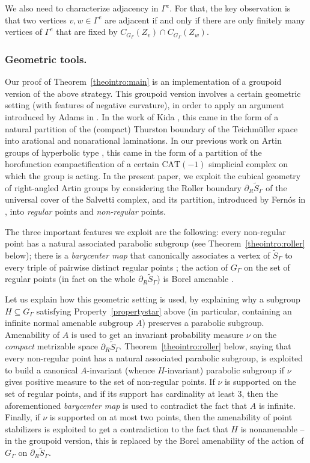 \documentclass[11pt]{article}
\numberwithin{equation}{section}
\theoremstyle{plain}
\theoremstyle{definition}
\begin{document}
We also need to characterize adjacency in $\Gamma^e$. For that, the key observation is that two vertices $v,w\in \Gamma^e$ are adjacent if and only if there are only finitely many vertices of $\Gamma^e$ that are fixed by $C_{G_\Gamma}(Z_v)\cap C_{G_\Gamma}(Z_w)$.

\subsubsection*{Geometric tools.} Our proof of Theorem~\ref{theointro:main} is an implementation of a groupoid version of the above strategy. This groupoid version involves a certain geometric setting (with features of negative curvature), in order to apply an argument introduced by Adams in \cite{Ada}. In the work of Kida \cite{Kid}, this came in the form of a natural partition of the (compact) Thurston boundary of the Teichmüller space into arational and nonarational laminations. In our previous work on Artin groups of hyperbolic type \cite{HH}, this came in the form of a partition of the horofunction compactification of a certain $\mathrm{CAT}(-1)$ simplicial complex on which the group is acting. In the present paper, we exploit the cubical geometry of right-angled Artin groups by considering the Roller boundary $\partial_R\widetilde{S}_\Gamma$ of the universal cover of the Salvetti complex, and its partition, introduced by Fernós in \cite{Fer}, into \emph{regular} points and \emph{non-regular} points.

The three important features we exploit are the following: every non-regular point has a natural associated parabolic subgroup (see Theorem~\ref{theointro:roller} below); there is a \emph{barycenter map} that canonically associates a vertex of $\widetilde{S}_\Gamma$ to every triple of pairwise distinct regular points \cite{FLM}; the action of $G_\Gamma$ on the set of regular points (in fact on the whole $\partial_R\widetilde{S}_\Gamma$) is Borel amenable \cite{NS,Duc}.

Let us explain how this geometric setting is used, by explaining why a subgroup $H\subseteq G_\Gamma$ satisfying Property~\eqref{propertystar} above (in particular, containing an infinite normal amenable subgroup $A$) preserves a parabolic subgroup. Amenability of $A$ is used to get an invariant probability measure $\nu$ on the \emph{compact} metrizable space $\partial_R\widetilde{S}_\Gamma$. Theorem~\ref{theointro:roller} below, saying that every non-regular point has a natural associated parabolic subgroup, is exploited to build a canonical $A$-invariant (whence $H$-invariant) parabolic subgroup if $\nu$ gives positive measure to the set of non-regular points. If $\nu$ is supported on the set of regular points, and if its support has cardinality at least $3$, then the aforementioned \emph{barycenter map} is used to contradict the fact that $A$ is infinite. Finally, if $\nu$ is supported on at most two points, then the amenability of point stabilizers is exploited to get a contradiction to the fact that $H$ is nonamenable -- in the groupoid version, this is replaced by the Borel amenability of the action of $G_\Gamma$ on $\partial_R\widetilde{S}_\Gamma$.
\end{document}
